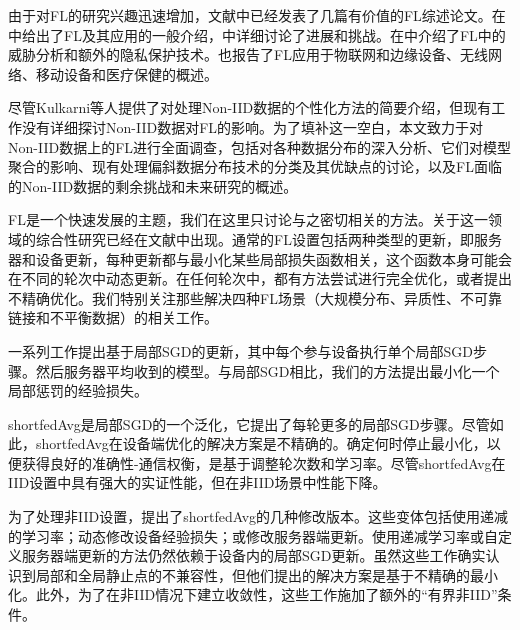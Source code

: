 由于对FL的研究兴趣迅速增加，文献中已经发表了几篇有价值的FL综述论文。在\supercite{yang2019federated,ZHANG2021106775}中给出了FL及其应用的一般介绍，\supercite{kairouz2019advances,li2020federated}中详细讨论了进展和挑战。在\supercite{vepakomma2018no,li2019survey,briggs2020review,lyu2020threats}中介绍了FL中的威胁分析和额外的隐私保护技术。也报告了FL应用于物联网和边缘设备\supercite{lan2019introduction,imteaj2020federated,shi2020communication}、无线网络\supercite{hosseinalipour2020federated}、移动设备\supercite{lim2020federated}和医疗保健\supercite{xujie2021federated}的概述。

尽管Kulkarni等人\supercite{kulkarni2020survey}提供了对处理Non-IID数据的个性化方法的简要介绍，但现有工作没有详细探讨Non-IID数据对FL的影响。为了填补这一空白，本文致力于对Non-IID数据上的FL进行全面调查，包括对各种数据分布的深入分析、它们对模型聚合的影响、现有处理偏斜数据分布技术的分类及其优缺点的讨论，以及FL面临的Non-IID数据的剩余挑战和未来研究的概述。

FL是一个快速发展的主题，我们在这里只讨论与之密切相关的方法。关于这一领域的综合性研究已经在文献\supercite{kairouz2019advances, li2019federated}中出现。通常的FL设置包括两种类型的更新，即服务器和设备更新，每种更新都与最小化某些局部损失函数相关，这个函数本身可能会在不同的轮次中动态更新。在任何轮次中，都有方法尝试进行完全优化，或者提出不精确优化。我们特别关注那些解决四种FL场景（大规模分布、异质性、不可靠链接和不平衡数据）的相关工作。

一系列工作提出基于局部SGD\supercite{stich2019local}的更新，其中每个参与设备执行单个局部SGD步骤。然后服务器平均收到的模型。与局部SGD相比，我们的方法提出最小化一个局部惩罚的经验损失。

shortfedAvg\supercite{mcmahan2017communication}是局部SGD的一个泛化，它提出了每轮更多的局部SGD步骤。尽管如此，shortfedAvg在设备端优化的解决方案是不精确的。确定何时停止最小化，以便获得良好的准确性-通信权衡，是基于调整轮次数和学习率\supercite{mcmahan2017communication, Li2020On}。尽管shortfedAvg在IID设置中具有强大的实证性能，但在非IID场景中性能下降\supercite{zhao2018federated}。

为了处理非IID设置，提出了shortfedAvg的几种修改版本。这些变体包括使用递减的学习率\supercite{Li2020On}；动态修改设备经验损失\supercite{li2018federated}；或修改服务器端更新\supercite{hsu2019measuring, reddi2020adaptive}。使用递减学习率或自定义服务器端更新的方法仍然依赖于设备内的局部SGD更新。虽然这些工作确实认识到局部和全局静止点的不兼容性，但他们提出的解决方案是基于不精确的最小化。此外，为了在非IID情况下建立收敛性，这些工作施加了额外的“有界非IID”条件。

